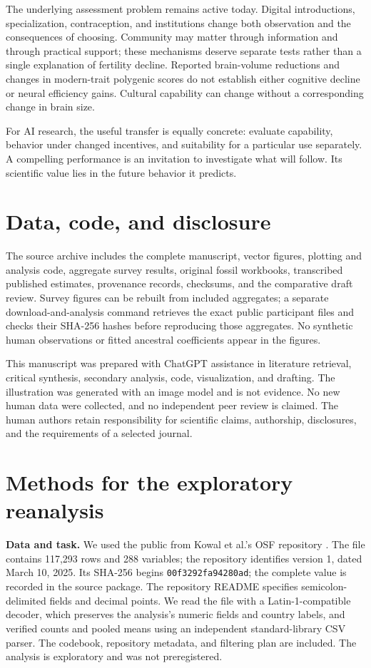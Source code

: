 \documentclass[10pt,twocolumn,letterpaper]{article}
\begin{document}
The underlying assessment problem remains active today. Digital introductions, specialization, contraception, and institutions change both observation and the consequences of choosing. Community may matter through information and through practical support; these mechanisms deserve separate tests rather than a single explanation of fertility decline. Reported brain-volume reductions and changes in modern-trait polygenic scores do not establish either cognitive decline or neural efficiency gains. Cultural capability can change without a corresponding change in brain size.

For AI research, the useful transfer is equally concrete: evaluate capability, behavior under changed incentives, and suitability for a particular use separately. A compelling performance is an invitation to investigate what will follow. Its scientific value lies in the future behavior it predicts.

\section*{Data, code, and disclosure}
The source archive includes the complete manuscript, vector figures, plotting and analysis code, aggregate survey results, original fossil workbooks, transcribed published estimates, provenance records, checksums, and the comparative draft review. Survey figures can be rebuilt from included aggregates; a separate download-and-analysis command retrieves the exact public participant files and checks their SHA-256 hashes before reproducing those aggregates. No synthetic human observations or fitted ancestral coefficients appear in the figures.

This manuscript was prepared with ChatGPT assistance in literature retrieval, critical synthesis, secondary analysis, code, visualization, and drafting. The illustration was generated with an image model and is not evidence. No new human data were collected, and no independent peer review is claimed. The human authors retain responsibility for scientific claims, authorship, disclosures, and the requirements of a selected journal.

\appendix
\section{Methods for the exploratory reanalysis}\label{app:methods}
\textbf{Data and task.} We used the public  from Kowal et al.'s OSF repository \citep{kowal2025,kowaldata}. The file contains 117,293 rows and 288 variables; the repository identifies version 1, dated March 10, 2025. Its SHA-256 begins \texttt{00f3292fa94280ad}; the complete value is recorded in the source package. The repository README specifies semicolon-delimited fields and decimal points. We read the file with a Latin-1-compatible decoder, which preserves the analysis's numeric fields and country labels, and verified counts and pooled means using an independent standard-library CSV parser. The codebook, repository metadata, and filtering plan are included. The analysis is exploratory and was not preregistered.
\end{document}
